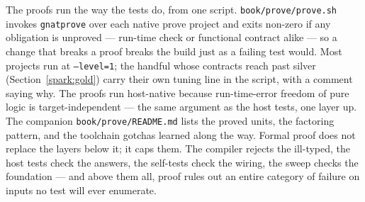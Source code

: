The proofs run the way the tests do, from one script. \texttt{book/prove/prove.sh}
invokes \texttt{gnatprove} over each native prove project and exits non-zero if any
obligation is unproved --- run-time check or functional contract alike --- so a change
that breaks a proof breaks the build just as a failing test would. Most projects run at
\texttt{--level=1}; the handful whose contracts reach past silver (Section~\ref{spark:gold})
carry their own tuning line in the script, with a comment saying why. The proofs run host-native because run-time-error
freedom of pure logic is target-independent --- the same argument as the host tests,
one layer up. The companion \texttt{book/prove/README.md} lists the proved units, the
factoring pattern, and the toolchain gotchas learned along the way. Formal proof does
not replace the layers below it; it caps them. The compiler rejects the ill-typed, the
host tests check the answers, the self-tests check the wiring, the sweep checks the
foundation --- and above them all, proof rules out an entire category of failure on
inputs no test will ever enumerate.

